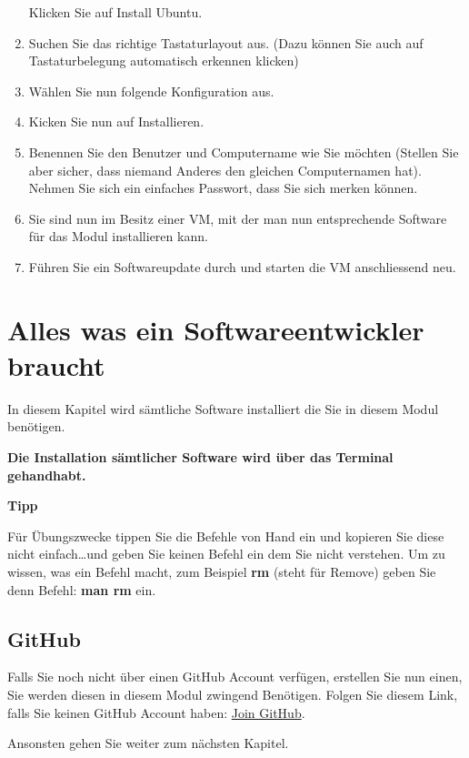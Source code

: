 \begin{frame}[fragile]
\begin{enumerate}
        Klicken Sie auf Install Ubuntu.
        \item Suchen Sie das richtige Tastaturlayout aus. (Dazu können Sie auch auf Tastaturbelegung automatisch erkennen klicken)
        \item Wählen Sie nun folgende Konfiguration aus.
        \item Kicken Sie nun auf Installieren.
        \item Benennen Sie den Benutzer und Computername wie Sie möchten (Stellen Sie aber sicher, dass niemand Anderes den gleichen Computernamen hat).
        Nehmen Sie sich ein einfaches Passwort, dass Sie sich merken können.
        \item Sie sind nun im Besitz einer VM, mit der man nun entsprechende Software für das Modul installieren kann.
        \item Führen Sie ein Softwareupdate durch und starten die VM anschliessend neu.
    \end{enumerate}
\end{frame}


\section{Alles was ein Softwareentwickler braucht}\label{sec:software}
\begin{frame}[fragile]
    In diesem Kapitel wird sämtliche Software installiert die Sie in diesem Modul benötigen.

    \textbf{Die Installation sämtlicher Software wird über das Terminal gehandhabt.}

    \textbf{Tipp}
    \vSpaceStyle{0.1em}

    Für Übungszwecke tippen Sie die Befehle von Hand ein und kopieren Sie diese nicht einfach\ldots und geben Sie keinen
    Befehl ein dem Sie nicht verstehen.
    Um zu wissen, was ein Befehl macht, zum Beispiel \textbf{rm} (steht für Remove) geben Sie denn Befehl: \textbf{man rm} ein.
\end{frame}

\subsection{GitHub}\label{subsec:github}
\begin{frame}[fragile]
    Falls Sie noch nicht über einen GitHub Account verfügen, erstellen Sie nun einen, Sie werden diesen in diesem Modul
    zwingend Benötigen.
    Folgen Sie diesem Link, falls Sie keinen GitHub Account haben: \href{https://github.com/join}{Join GitHub}.

    Ansonsten gehen Sie weiter zum nächsten Kapitel.
\end{frame}


